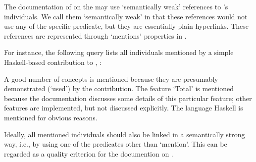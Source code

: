 The documentation of \solasote{} on the  may use
`semantically weak' references to \solasote's individuals. We call
them `semantically weak' in that these references would not use any of
the specific predicate, but they are essentially plain
hyperlinks. These references are represented through `mentions'
properties in \solasote. 

For instance, the following query lists all individuals mentioned by a
simple Haskell-based contribution to \ooo{},
:



\noindent
A good number of concepts is mentioned because they are presumably
demonstrated (`used') by the contribution. The feature `Total' is
mentioned because the documentation discusses some details of this
particular feature; other features are implemented, but not discussed
explicitly. The language Haskell is mentioned for obvious reasons.

Ideally, all mentioned individuals should also be linked in a
semantically strong way, i.e., by using one of the predicates other
than `mention'. This can be regarded as a quality criterion for the
documention on .

